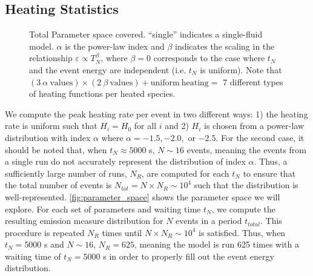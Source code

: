 \documentclass[preprint]{aastex}
\begin{document}
	\subsection{Heating Statistics}
	\label{subsec:heating_stats}
	\begin{figure}
		\centering
		
		\caption{Total Parameter space covered. ``single'' indicates a single-fluid model. $\alpha$ is the power-law index and $\beta$ indicates the scaling in the relationship $\varepsilon\propto T_N^{\beta}$, where $\beta=0$ corresponds to the case where $t_N$ and the event energy are independent (i.e. $t_N$ is uniform). Note that $(3~\alpha~\mathrm{values})\times(2~\beta~\mathrm{values})+\mathrm{uniform~heating}=$ 7 different types of heating functions per heated species.}
		\label{fig:parameter_space}
	\end{figure}
	\par We compute the peak heating rate per event in two different ways: 1) the heating rate is uniform such that $H_i=H_0$ for all $i$ and 2) $H_i$ is chosen from a power-law distribution with index $\alpha$ where $\alpha=-1.5,-2.0,$ or $-2.5$. For the second case, it should be noted that, when $t_N\approx5000$ s, $N\sim16$ events, meaning the events from a single run do not accurately represent the distribution of index $\alpha$. Thus, a sufficiently large number of runs, $N_{R}$, are computed for each $t_N$ to ensure that the total number of events is $N_{tot}=N\times N_{R}\sim10^4$ such that the distribution is well-represented. \autoref{fig:parameter_space} shows the parameter space we will explore. For each set of parameters and waiting time $t_N$, we compute the resulting emission measure distribution for $N$ events in a period $t_{total}$. This procedure is repeated $N_R$ times until $N\times N_R\sim10^4$ is satisfied. Thus, when $t_N=5000$ s and $N\sim16$, $N_R=625$, meaning the model is run 625 times with a waiting time of $t_N=5000$ s in order to properly fill out the event energy distribution.
\end{document}
